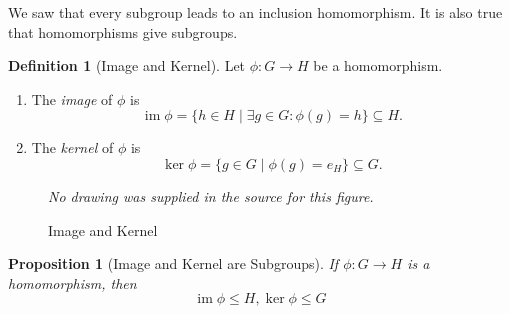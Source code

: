 \documentclass{article}
\newtheorem{proposition}[theorem]{Proposition}
\theoremstyle{definition}
\newtheorem{definition}[theorem]{Definition}
\theoremstyle{remark}
\newcommand{\pqty}[1]{\left(#1\right)}
\newcommand{\set}[2]{\{#1\mid #2\}}
\newcommand{\functiondomain}[3]{#1:#2\to #3}
\newcommand{\subgroup}{\leq}
\newcommand{\img}{\operatorname{im}}
\begin{document}
We saw that every subgroup leads to an inclusion homomorphism. It is also true that homomorphisms give subgroups.

\begin{definition}[Image and Kernel]
    \label{def:image-kernel}%
    Let \(\functiondomain{\phi}{G}{H}\) be a homomorphism.

    \begin{enumerate}
        \item The \emph{image} of \(\phi\) is
        \[
            \img \phi = \set{h \in H}{\exists g \in G: \phi\pqty{g} = h} \subseteq H.
        \]
        \item The \emph{kernel} of \(\phi\) is
        \[
            \ker \phi = \set{g \in G}{\phi\pqty{g} = e_H} \subseteq G.
        \]
    \end{enumerate}
\end{definition}

\begin{figure}[ht!]
    \centering
    \emph{No drawing was supplied in the source for this figure.}\par
\caption{Image and Kernel}
    \label{fig:image-and-kernel}
\end{figure}

\begin{proposition}[Image and Kernel are Subgroups]
    If \(\functiondomain{\phi}{G}{H}\) is a homomorphism, then
    \[
        \img \phi \subgroup H, \ker \phi \subgroup G
    \]
\end{proposition}
\end{document}
